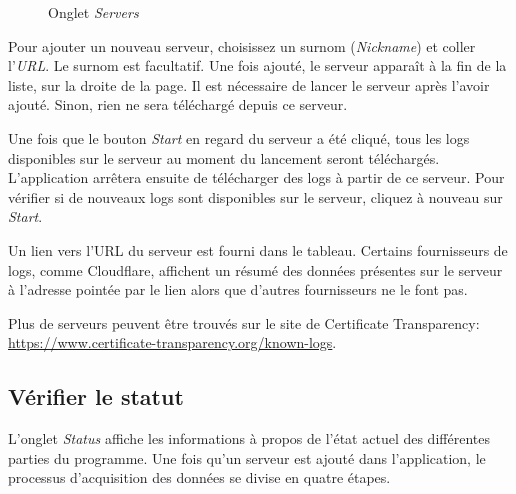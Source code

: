 \documentclass{article}
\begin{document}
\begin{figure}
\noindent{}
\caption{Onglet \emph{Servers}}
\label{servers-fig}
\end{figure}

Pour ajouter un nouveau serveur, choisissez un surnom (\emph{Nickname}) et coller l'\emph{URL}.  Le surnom est facultatif.  Une fois ajouté, le serveur apparaît à la fin de la liste, sur la droite de la page.  Il est nécessaire de lancer le serveur après l'avoir ajouté.  Sinon, rien ne sera téléchargé depuis ce serveur.

Une fois que le bouton \emph{Start} en regard du serveur a été cliqué, tous les logs disponibles sur le serveur au moment du lancement seront téléchargés.  L'application arrêtera ensuite de télécharger des logs à partir de ce serveur.  Pour vérifier si de nouveaux logs sont disponibles sur le serveur, cliquez à nouveau sur \emph{Start}.

Un lien vers l'URL du serveur est fourni dans le tableau.  Certains fournisseurs de logs, comme Cloudflare, affichent un résumé des données présentes sur le serveur à l'adresse pointée par le lien alors que d'autres fournisseurs ne le font pas.

Plus de serveurs peuvent être trouvés sur le site de Certificate Transparency: \url{https://www.certificate-transparency.org/known-logs}.

\subsection{Vérifier le statut}


L'onglet \emph{Status} affiche les informations à propos de l'état actuel des différentes parties du programme.  Une fois qu'un serveur est ajouté dans l'application, le processus d'acquisition des données se divise en quatre étapes.
\end{document}
